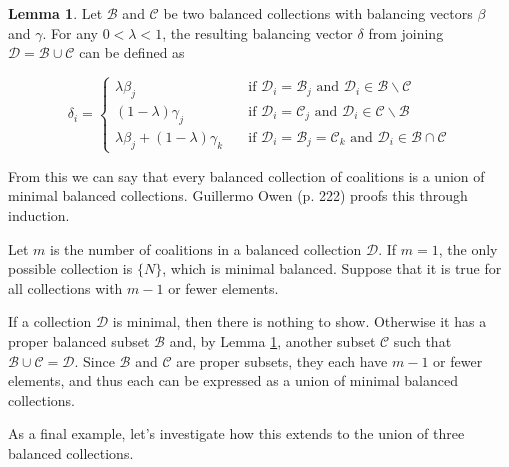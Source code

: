 \documentclass[10pt,a4paper,titlepage]{article}
\theoremstyle{plain}
\theoremstyle{definition}
\newtheorem{lemma}[thm]{Lemma}
\begin{document}
\begin{lemma}\label{lem:balancedunion}
    Let $\mathcal{B}$ and $\mathcal{C}$ be two balanced collections with balancing vectors $\beta$ and $\gamma$. For any $0 < \lambda < 1$, the resulting balancing vector $\delta$ from joining $\mathcal{D} = \mathcal{B} \cup \mathcal{C}$ can be defined as

    \begin{equation}
        \delta_i = \begin{cases}
            \lambda \beta_j & \quad \text{if } \mathcal{D}_i = \mathcal{B}_j \text{ and } \mathcal{D}_i \in \mathcal{B} \backslash \mathcal{C}\\
            (1 - \lambda) \gamma_j & \quad \text{if } \mathcal{D}_i = \mathcal{C}_j \text{ and } \mathcal{D}_i \in \mathcal{C} \backslash \mathcal{B}\\
            \lambda \beta_j + (1 - \lambda) \gamma_k & \quad \text{if } \mathcal{D}_i = \mathcal{B}_j = \mathcal{C}_k \text{ and } \mathcal{D}_i \in \mathcal{B} \cap \mathcal{C}
        \end{cases}
    \end{equation}
\end{lemma}

From this we can say that every balanced collection of coalitions is a union of minimal balanced collections. Guillermo Owen\cite{owen} (p. 222) proofs this through induction.

Let $m$ is the number of coalitions in a balanced collection $\mathcal{D}$. If $m = 1$, the only possible collection is $\{ N \}$, which is minimal balanced. Suppose that it is true for all collections with $m - 1$ or fewer elements.

If a collection $\mathcal{D}$ is minimal, then there is nothing to show. Otherwise it has a proper balanced subset $\mathcal{B}$ and, by Lemma \ref{lem:balancedunion}, another subset $\mathcal{C}$ such that $\mathcal{B} \cup \mathcal{C} = \mathcal{D}$. Since $\mathcal{B}$ and $\mathcal{C}$ are proper subsets, they each have $m - 1$ or fewer elements, and thus each can be expressed as a union of minimal balanced collections.\vspace{10pt}

As a final example, let's investigate how this extends to the union of three balanced collections.
\end{document}
